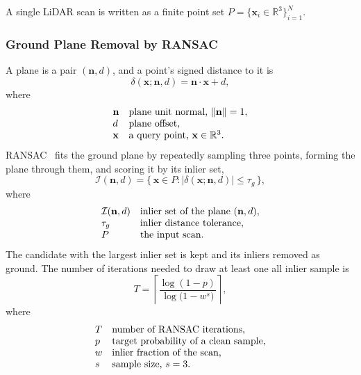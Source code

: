 \documentclass[a4paper,12pt]{report}
\begin{document}
\FloatBarrier
A single LiDAR scan is written as a finite point set
$P = \{\mathbf{x}_i \in \mathbb{R}^3\}_{i=1}^{N}$.

\subsubsection{Ground Plane Removal by RANSAC}
\label{sec:th-ransac}
A plane is a pair $(\mathbf{n}, d)$, and a point's signed distance to it is
\begin{equation}
  \delta(\mathbf{x};\mathbf{n},d) = \mathbf{n}\cdot\mathbf{x} + d ,
\end{equation}
where
\[
  \begin{array}{@{}l@{\quad}l@{}}
    \mathbf{n} & \text{plane unit normal, } \lVert\mathbf{n}\rVert = 1,\\
    d & \text{plane offset,}\\
    \mathbf{x} & \text{a query point, } \mathbf{x}\in\mathbb{R}^3.
  \end{array}
\]
RANSAC~\cite{fischler1981random} fits the ground plane by repeatedly sampling three points,
forming the plane through them, and scoring it by its inlier set,
\begin{equation}
  \mathcal{I}(\mathbf{n},d) = \bigl\{\, \mathbf{x}\in P : \lvert \delta(\mathbf{x};\mathbf{n},d)\rvert \le \tau_g \,\bigr\},
\end{equation}
where
\[
  \begin{array}{@{}l@{\quad}l@{}}
    \mathcal{I}(\mathbf{n},d) & \text{inlier set of the plane } (\mathbf{n},d),\\
    \tau_g & \text{inlier distance tolerance,}\\
    P & \text{the input scan.}
  \end{array}
\]
The candidate with the largest inlier set is kept and its inliers removed as ground. The
number of iterations needed to draw at least one all inlier sample is
\begin{equation}
  T = \left\lceil \frac{\log(1-p)}{\log\!\bigl(1 - w^{s}\bigr)} \right\rceil ,
\end{equation}
where
\[
  \begin{array}{@{}l@{\quad}l@{}}
    T & \text{number of RANSAC iterations,}\\
    p & \text{target probability of a clean sample,}\\
    w & \text{inlier fraction of the scan,}\\
    s & \text{sample size, } s=3.
  \end{array}
\]
\end{document}

